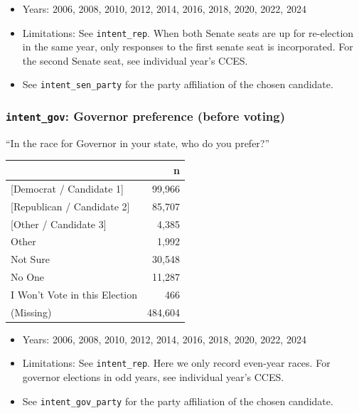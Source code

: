 \documentclass[10pt,article,oneside]{memoir}
\begin{document}
\begin{itemize}
\tightlist
\item
  Years: 2006, 2008, 2010, 2012, 2014, 2016, 2018, 2020, 2022, 2024
\item
  Limitations: See \texttt{intent\_rep}. When both Senate seats are up
  for re-election in the same year, only responses to the first senate
  seat is incorporated. For the second Senate seat, see individual
  year's CCES.
\item
  See \texttt{intent\_sen\_party} for the party affiliation of the
  chosen candidate.
\end{itemize}

\subsubsection{\texorpdfstring{\texttt{intent\_gov}: Governor preference
(before
voting)}{intent\_gov: Governor preference (before voting)}}\label{intent_gov-governor-preference-before-voting}

``In the race for Governor in your state, who do you prefer?''

\begin{table}[H]
\centering
\begin{tabular}[t]{lr}
\toprule
 & n\\
\midrule
{}{[Democrat / Candidate 1]} & 99,966\\
{}{[Republican / Candidate 2]} & 85,707\\
{}{[Other / Candidate 3]} & 4,385\\
Other & 1,992\\
Not Sure & 30,548\\
No One & 11,287\\
I Won't Vote in this Election & 466\\
(Missing) & 484,604\\
\bottomrule
\end{tabular}
\end{table}

\begin{itemize}
\tightlist
\item
  Years: 2006, 2008, 2010, 2012, 2014, 2016, 2018, 2020, 2022, 2024
\item
  Limitations: See \texttt{intent\_rep}. Here we only record even-year
  races. For governor elections in odd years, see individual year's
  CCES.
\item
  See \texttt{intent\_gov\_party} for the party affiliation of the
  chosen candidate.
\end{itemize}
\end{document}
